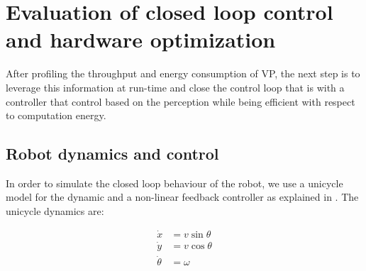 \section{Evaluation of closed loop control and hardware optimization}
\label{sec:evaluation}
After profiling the throughput and energy consumption of VP, the next step is to leverage this information at run-time and close the control loop that is with a controller that  control based on the perception while being efficient with respect to computation energy.

%



\subsection{Robot dynamics and control}
\label{sec:robotDynamics}
In order to simulate the closed loop behaviour of the robot, we use a unicycle model for the dynamic and a non-linear feedback controller as explained in \cite{VP2}. The unicycle dynamics are:

\begin{subequations}
\begin{align}
\dot{x} &= v\sin\theta \nonumber \\
\dot{y} &= v\cos\theta \nonumber \\
\dot{\theta} &= \omega 
\end{align}
\label{eq:plant}
\end{subequations}

